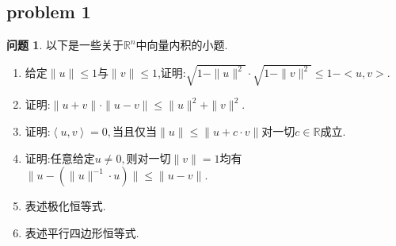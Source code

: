 \documentclass[11pt]{ctexart}
\theoremstyle{definition}
\newtheorem{qqq}{问题}[section]
\numberwithin{equation}{section}
\begin{document}
\subsection{problem 1}
\begin{qqq}
    以下是一些关于$\mathbb{R}^n$中向量内积的小题.
    \begin{enumerate}
        \item 给定$\|u\|\leq 1$与$\|v\|\leq 1$,证明:$\sqrt{1-\|u\|^2}\cdot \sqrt{1-\|v\|^2}\leq 1-<u,v>.$
        \item 证明:$\|u+v\|\cdot\|u-v\|\leq\|u\|^2+\|v\|^2.$
        \item 证明:$\left\langle u,v\right\rangle =0,$当且仅当$\|u\|\leq\|u+c\cdot v\|$对一切$c\in\mathbb{R}$成立.
        \item 证明:任意给定$u\neq 0,$则对一切$\|v\|=1$均有$\|u-(\|u\|^{-1}\cdot u)\|\leq \|u-v\|.$
        \item 表述极化恒等式.
        \item 表述平行四边形恒等式.
    \end{enumerate}
\end{qqq}
\end{document}
